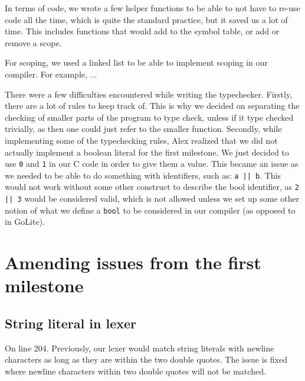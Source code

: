 \documentclass{article}
\begin{document}
In terms of code, we wrote a few helper functions to be able to not have to
re-use code all the time, which is quite the standard practice, but it saved
us a lot of time. This includes functions that would add to the symbol table, or
add or remove a scope.

For scoping, we used a linked list to be able to implement scoping in our compiler.
For example, ... %


There were a few difficulties encountered while writing the typechecker. Firstly,
there are a lot of rules to keep track of. This is why we decided on separating
the checking of smaller parts of the program to type check, unless if it type
checked trivially, as then one could just refer to the smaller function.
Secondly, while implementing some of the typechecking rules, Alex realized that
we did not actually implement a boolean literal for the first milestone. We
just decided to use \verb$0$ and \verb$1$ in our C code in order to give them
a value. This became an issue as we needed to be able to do something with
identifiers, such as: \verb$a || b$. This would not work without some other
construct to describe the bool identifier, as \verb$2 || 3$ would be considered
valid, which is not allowed unless we set up some other notion of what we
define a \verb$bool$ to be considered in our compiler (as opposed to in GoLite).


\section{Amending issues from the first milestone}


\subsection{String literal in lexer}
On line 204. Previously, our lexer would match string literals with newline characters as long as they are within the two double quotes. The issue is fixed where newline characters within two double quotes will not be matched.
\end{document}
